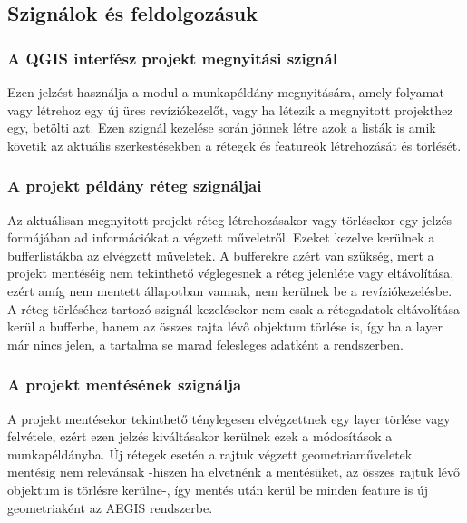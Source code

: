\subsection{Szignálok és feldolgozásuk}
\subsubsection{A QGIS interfész projekt megnyitási szignál}
Ezen jelzést használja a modul a munkapéldány megnyitására, amely folyamat vagy létrehoz egy új üres revíziókezelőt, vagy ha létezik a megnyitott projekthez egy, betölti azt. Ezen szignál kezelése során jönnek létre azok a listák is amik követik az aktuális szerkestésekben a rétegek és featureök létrehozását és törlését.
\subsubsection{A projekt példány réteg szignáljai}
Az aktuálisan megnyitott projekt réteg létrehozásakor vagy törlésekor egy jelzés formájában ad információkat a végzett műveletről. Ezeket kezelve kerülnek a bufferlistákba az elvégzett műveletek. A bufferekre azért van szükség, mert a projekt mentéséig nem tekinthető véglegesnek a réteg jelenléte vagy eltávolítása, ezért amíg nem mentett állapotban vannak, nem kerülnek be a revíziókezelésbe. A réteg törléséhez tartozó szignál kezelésekor nem csak a rétegadatok eltávolítása kerül a bufferbe, hanem az összes rajta lévő objektum törlése is, így ha a layer már nincs jelen, a tartalma se marad felesleges adatként a rendszerben.
\subsubsection{A projekt mentésének szignálja}
A projekt mentésekor tekinthető ténylegesen elvégzettnek egy layer törlése vagy felvétele, ezért ezen jelzés kiváltásakor kerülnek ezek a módosítások a munkapéldányba. Új rétegek esetén a rajtuk végzett geometriaműveletek mentésig nem relevánsak -hiszen ha elvetnénk a mentésüket, az összes rajtuk lévő objektum is törlésre kerülne-, így mentés után kerül be minden feature is új geometriaként az AEGIS rendszerbe.
